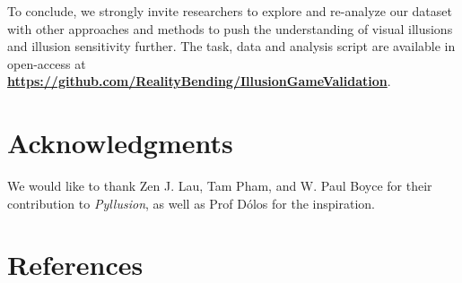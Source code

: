 \documentclass[
  man,floatsintext]{apa6}
\begin{document}
To conclude, we strongly invite researchers to explore and re-analyze our dataset with other approaches and methods to push the understanding of visual illusions and illusion sensitivity further. The task, data and analysis script are available in open-access at \href{https://github.com/RealityBending/IllusionGameValidation}{\textbf{https://github.com/RealityBending/IllusionGameValidation}}.

\hypertarget{acknowledgments}{%
\section{Acknowledgments}\label{acknowledgments}}

We would like to thank Zen J. Lau, Tam Pham, and W. Paul Boyce for their contribution to \emph{Pyllusion}, as well as Prof Dólos for the inspiration.

\newpage

\hypertarget{references}{%
\section{References}\label{references}}
\end{document}
